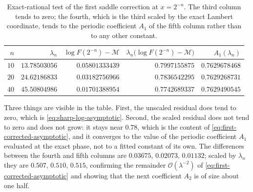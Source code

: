 \documentclass[11pt,oneside]{article}
\theoremstyle{definition}
\theoremstyle{remark}
\newcommand{\bigO}{\mathcal O}
\begin{document}
\begin{table}[htbp]
\centering
\begin{tabular}{@{}rrrrr@{}}
\toprule
$n$ & $\lambda_n$ & $\log F(2^{-n})-\mathcal M$ &
$\lambda_n\bigl(\log F(2^{-n})-\mathcal M\bigr)$ & $A_1(\lambda_n)$\\
\midrule
$10$ & $13.78503056$ & $0.05801333439$ & $0.7997155875$ & $0.7629678468$\\
$20$ & $24.62186833$ & $0.03182756966$ & $0.7836542295$ & $0.7629268731$\\
$40$ & $45.50804986$ & $0.01701388954$ & $0.7742689337$ & $0.7629490545$\\
\bottomrule
\end{tabular}
\caption{Exact-rational test of the first saddle correction at $x=2^{-n}$.  The third column
tends to zero; the fourth, which is the third scaled by the exact Lambert coordinate, tends
to the periodic coefficient $A_1$ of the fifth column rather than to any other constant.}
\label{tab:as-numerics}
\end{table}

Three things are visible in the table.  First, the unscaled residual does tend to zero, which
is \eqref{eq:sharp-log-asymptotic}.  Second, the scaled residual does not tend to zero and
does not grow: it stays near $0.78$, which is the content of
\eqref{eq:first-corrected-asymptotic}, and it converges to the value of the periodic
coefficient $A_1$ evaluated at the exact phase, not to a fitted constant of its own.  The
differences between the fourth and fifth columns are $0.03675$, $0.02073$, $0.01132$; scaled
by $\lambda_n$ they are $0.507$, $0.510$, $0.515$, confirming the remainder
$\bigO(\lambda^{-2})$ of \eqref{eq:first-corrected-asymptotic} and showing that the next
coefficient $A_2$ is of size about one half.
\end{document}
